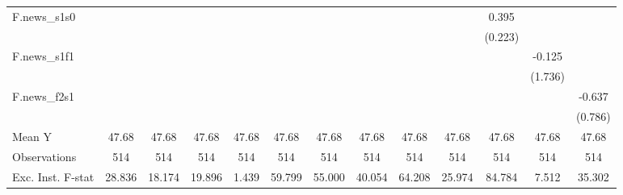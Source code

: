 {\begin{tabular}{l*{12}{c}}
\addlinespace
F.news\_s1s0 &                     &                     &                     &                     &                     &                     &                     &                     &                     &       0.395\sym{*}  &                     &                     \\
            &                     &                     &                     &                     &                     &                     &                     &                     &                     &     (0.223)         &                     &                     \\
\addlinespace
F.news\_s1f1 &                     &                     &                     &                     &                     &                     &                     &                     &                     &                     &      -0.125         &                     \\
            &                     &                     &                     &                     &                     &                     &                     &                     &                     &                     &     (1.736)         &                     \\
\addlinespace
F.news\_f2s1 &                     &                     &                     &                     &                     &                     &                     &                     &                     &                     &                     &      -0.637         \\
            &                     &                     &                     &                     &                     &                     &                     &                     &                     &                     &                     &     (0.786)         \\
\midrule
Mean Y      &       47.68         &       47.68         &       47.68         &       47.68         &       47.68         &       47.68         &       47.68         &       47.68         &       47.68         &       47.68         &       47.68         &       47.68         \\
Observations&         514         &         514         &         514         &         514         &         514         &         514         &         514         &         514         &         514         &         514         &         514         &         514         \\
Exc. Inst. F-stat&      28.836         &      18.174         &      19.896         &       1.439         &      59.799         &      55.000         &      40.054         &      64.208         &      25.974         &      84.784         &       7.512         &      35.302         \\
\bottomrule
\end{tabular}
}
